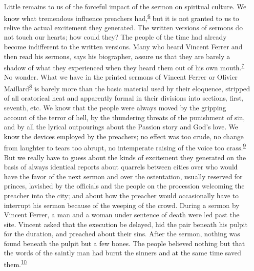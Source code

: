 Little remains to us of the forceful impact of the sermon on spiritual
culture. We know what tremendous influence preachers
had,\textsuperscript{\protect\hypertarget{15_Chapter_Eight__RELIGIOUS_EXCITAT.xhtmlux5cux23id_895}{\protect\hyperlink{23_NOTES.xhtmlux5cux23id_896}{6}}}
but it is not granted to us to relive the actual excitement they
generated. The written versions of sermons do not touch our hearts; how
could they? The people of the time had already become indifferent to the
written versions. Many who heard Vincent Ferrer and then read his
sermons, says his biographer, assure us that they are barely a shadow of
what they experienced when they heard them out of his own
mouth.\textsuperscript{\protect\hypertarget{15_Chapter_Eight__RELIGIOUS_EXCITAT.xhtmlux5cux23id_893}{\protect\hyperlink{23_NOTES.xhtmlux5cux23id_894}{7}}}
No wonder. What we have in the printed sermons of Vincent Ferrer or
Olivier
Maillard\textsuperscript{\protect\hypertarget{15_Chapter_Eight__RELIGIOUS_EXCITAT.xhtmlux5cux23id_891}{\protect\hyperlink{23_NOTES.xhtmlux5cux23id_892}{8}}}
is barely more than the basic material used by their eloquence, stripped
of all oratorical heat and apparently formal in their divisions into
sections, first, seventh, etc. We know that the people were always moved
by the gripping account of the terror of hell, by the thundering threats
of the punishment of sin, and by all the lyrical outpourings about the
Passion story and God's love. We know the devices employed by the
preachers; no effect was too crude, no change from laughter to tears too
abrupt, no intemperate raising of the voice too
crass.\textsuperscript{\protect\hypertarget{15_Chapter_Eight__RELIGIOUS_EXCITAT.xhtmlux5cux23id_889}{\protect\hyperlink{23_NOTES.xhtmlux5cux23id_890}{9}}}
But we really have to guess about the kinds of excitement they generated
on the basis of always identical reports about quarrels between cities
over who would have the favor of the
\protect\hypertarget{15_Chapter_Eight__RELIGIOUS_EXCITAT.xhtmlux5cux23page_222}{}{}next
sermon and over the ostentation, usually reserved for princes, lavished
by the officials and the people on the procession welcoming the preacher
into the city; and about how the preacher would occasionally have to
interrupt his sermon because of the weeping of the crowd. During a
sermon by Vincent Ferrer, a man and a woman under sentence of death were
led past the site. Vincent asked that the execution be delayed, hid the
pair beneath his pulpit for the duration, and preached about their sins.
After the sermon, nothing was found beneath the pulpit but a few bones.
The people believed nothing but that the words of the saintly man had
burnt the sinners and at the same time saved
them.\textsuperscript{\protect\hypertarget{15_Chapter_Eight__RELIGIOUS_EXCITAT.xhtmlux5cux23id_887}{\protect\hyperlink{23_NOTES.xhtmlux5cux23id_888}{10}}}

